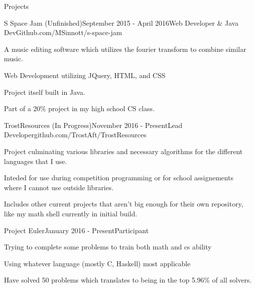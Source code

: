 \documentclass{resume} %
\begin{document}
\begin{rSection}{Projects}

\begin{rSubsection}{S Space Jam (Unfinished)}{September 2015 - April 2016}{Web Developer & Java Dev}{Github.com/MSinnott/s-space-jam}
\item A music editing software which utilizes the fourier transform to combine similar music.
\item Web Development utilizing JQuery, HTML, and CSS
\item Project itself built in Java.
\item Part of a 20\% project in my high school CS class.
\end{rSubsection}


\begin{rSubsection}{TrostResources (In Progress)}{November 2016 - Present}{Lead Developer}{github.com/TrostAft/TrostResources}
\item Project culminating various libraries and necessary algorithms for the different languages that I use. 
\item Inteded for use during competition programming or for school assignements where I cannot use outside libraries.
\item Includes other current projects that aren't big enough for their own repository, like my math shell currently in initial build.
\end{rSubsection}


\begin{rSubsection}{Project Euler}{January 2016 - Present}{Participant}
\item Trying to complete some problems to train both math and cs ability
\item Using whatever language (mostly C, Haskell) most applicable
\item Have solved 50 problems which translates to being in the top 5.96\% of all solvers. 
\end{rSubsection}

\end{rSection}

\end{document}
